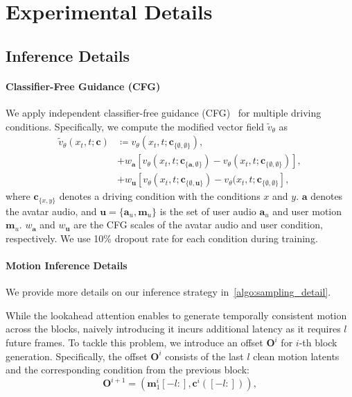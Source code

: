 \section{Experimental Details}\label{sec:apx_exp_detail}

\subsection{Inference Details}
\paragraph{Classifier-Free Guidance (CFG)} We apply independent classifier-free guidance (CFG)~\citep{instructpix2pix} for multiple driving conditions. Specifically, we compute the modified vector field $\tilde{v}_{\theta}$ as
\begin{equation}
\begin{aligned}
    \tilde{v}_\theta(x_t, t; \mathbf{c}) & \coloneq v_\theta(x_t, t; \mathbf{c}_{\{\emptyset,\emptyset\}}), \\
    & + w_{\mathbf{a}} [ v_\theta(x_t, t; \mathbf{c}_{\{\mathbf{a}, \emptyset\}}) - v_\theta(x_t, t; \mathbf{c}_{\{\emptyset,\emptyset\}})], \\
    & + w_{\mathbf{u}} [v_\theta(x_t, t; \mathbf{c}_{\{\emptyset, \mathbf{\mathbf{u}\}}}) - v_\theta(x_t, t; \mathbf{c}_{\{\emptyset, \emptyset\}}],\label{eq:apx_cfg}
\end{aligned}
\end{equation}
where $\mathbf{c}_{\{x, y\}}$ denotes a driving condition with the conditions $x$ and $y$. $\mathbf{a}$ denotes the avatar audio, and  $\mathbf{u} = \{\mathbf{a}_u, \mathbf{m}_u\}$ is the set of user audio $\mathbf{a}_u$ and user motion $\mathbf{m}_u$. $w_{\mathbf{a}}$ and $w_{\mathbf{u}}$ are the CFG scales of the avatar audio and user condition, respectively. We use 10\% dropout rate for each condition during training.



\paragraph{Motion Inference Details}
We provide more details on our inference strategy in~\cref{algo:sampling_detail}.

While the lookahead attention enables to generate temporally consistent motion across the blocks, naively introducing it incurs additional latency as it requires $l$ future frames. To tackle this problem, we introduce an offset $\mathbf{O}^i$ for $i$-th block generation. Specifically, the offset $\mathbf{O}^i$ consists of the last $l$ clean motion latents and the corresponding condition from the previous block:
\begin{equation}
    \mathbf{O}^{i+1} = (\mathbf{m}_1^{i}[-l:], \mathbf{c}^{i}([-l:])),\label{eq:offset}
\end{equation}

